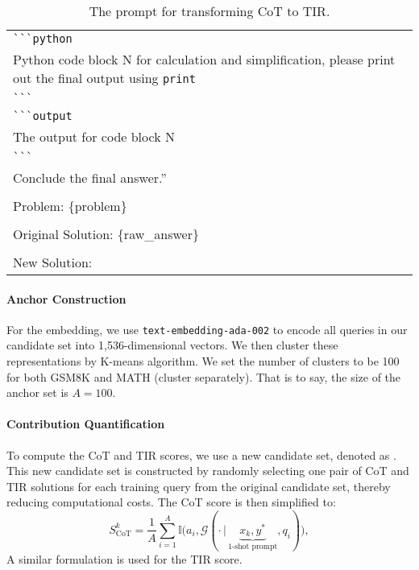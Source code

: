 \begin{table*}[htbp]
\begin{tabularx}{\textwidth}{|X|}
        \verb|```python| \\
        Python code block N for calculation and simplification, please print out the final output using \verb|print| \\
        \verb|```| \\
        \verb|```output| \\
        The output for code block N \\
        \verb|```| \\
        Conclude the final answer.'' \\
        \\
        Problem: \{problem\} \\
        \\
        Original Solution: \{raw\_answer\} \\
        \\
        New Solution: \\[5pt]
        \hline
    \end{tabularx}
    \caption{The prompt for transforming CoT to TIR.}
    \label{tabapp:rewrite_prompt}
\end{table*}



\paragraph{Anchor Construction}
For the embedding, we use \texttt{text-embedding-ada-002} to encode all queries in our candidate set {\dd} into 1,536-dimensional vectors.
We then cluster these representations by K-means algorithm.
We set the number of clusters to be 100 for both GSM8K and MATH (cluster separately).
That is to say, the size of the anchor set is $A=100$.


\paragraph{Contribution Quantification}
To compute the CoT and TIR scores, we use a new candidate set, denoted as {\dcandidatee}. This new candidate set is constructed by randomly selecting one pair of CoT and TIR solutions for each training query from the original candidate set, thereby reducing computational costs.
The CoT score is then simplified to:
{\small  
\begin{equation*}  
S_{\text{CoT}}^k = \frac{1}{A} \sum_{i=1}^A  \mathbb{I} \big(a_i, \mathcal{G}(\cdot \,|\, \underbrace{x_k, y^*}_{\text{1-shot prompt}}, q_i)\big),  
\end{equation*}  
}  
A similar formulation is used for the TIR score.


